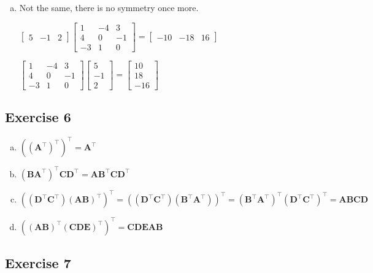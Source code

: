 \documentclass[11pt]{article}
\begin{document}
\begin{enumerate}[a.]
	\item %
	Not the same, there is no symmetry once more.

	$\begin{bmatrix}
		5 & -1 & 2
	\end{bmatrix}
	\begin{bmatrix}
		1 & -4 & 3 \\
		4 & 0 & -1 \\
		-3 & 1 & 0
	\end{bmatrix}=
	\begin{bmatrix}
		-10 & -18 & 16
	\end{bmatrix}$
	
	$\begin{bmatrix}
		1 & -4 & 3 \\
		4 & 0 & -1 \\
		-3 & 1 & 0
	\end{bmatrix}
	\begin{bmatrix}
		5 \\ -1 \\ 2
	\end{bmatrix}=
	\begin{bmatrix}
		10 \\ 18 \\ -16
	\end{bmatrix}$	
\end{enumerate}

\subsection{Exercise 6}

\begin{enumerate}[a.]
	\item $((\textbf{A}^\intercal)^\intercal)^\intercal=\textbf{A}^\intercal$
	\item $(\textbf{BA}^\intercal)^\intercal\textbf{CD}^\intercal=\textbf{AB}^\intercal\textbf{CD}^\intercal$
	\item $((\textbf{D}^\intercal\textbf{C}^\intercal)(\textbf{AB})^\intercal)^\intercal=((\textbf{D}^\intercal\textbf{C}^\intercal)(\textbf{B}^\intercal\textbf{A}^\intercal))^\intercal=(\textbf{B}^\intercal\textbf{A}^\intercal)^\intercal(\textbf{D}^\intercal\textbf{C}^\intercal)^\intercal=\textbf{ABCD}$
	\item $((\textbf{AB})^\intercal(\textbf{CDE})^\intercal)^\intercal=\textbf{CDEAB}$
\end{enumerate}

\subsection{Exercise 7}
\end{document}
